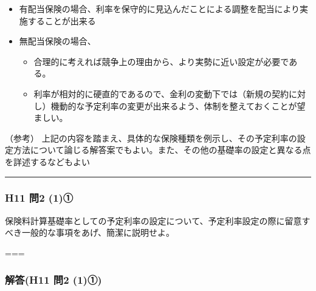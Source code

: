 \documentclass[]{article}
\begin{document}
\begin{itemize}
\tightlist
\item
  有配当保険の場合、利率を保守的に見込んだことによる調整を配当により実施することが出来る
\item
  無配当保険の場合、

  \begin{itemize}
  \tightlist
  \item
    合理的に考えれば競争上の理由から、より実勢に近い設定が必要である。
  \item
    利率が相対的に硬直的であるので、金利の変動下では（新規の契約に対し）機動的な予定利率の変更が出来るよう、体制を整えておくことが望ましい。
  \end{itemize}
\end{itemize}

（参考）
上記の内容を踏まえ、具体的な保険種類を例示し、その予定利率の設定方法について論じる解答案でもよい。また、その他の基礎率の設定と異なる点を詳述するなどもよい

\begin{center}\rule{0.5\linewidth}{0.5pt}\end{center}

\hypertarget{h11-ux554f2-1ux2460}{%
\subsubsection{H11 問2 (1)①}\label{h11-ux554f2-1ux2460}}

保険料計算基礎率としての予定利率の設定について、予定利率設定の際に留意すべき一般的な事項をあげ、簡潔に説明せよ。

===

\hypertarget{ux89e3ux7b54h11-ux554f2-1ux2460}{%
\subsubsection{解答(H11 問2
(1)①)}\label{ux89e3ux7b54h11-ux554f2-1ux2460}}
\end{document}
